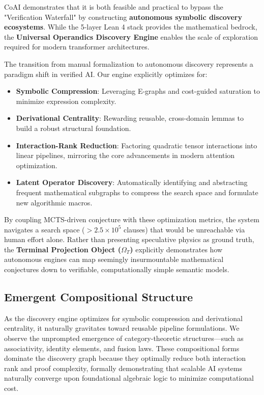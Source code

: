 \documentclass[11pt,a4paper,twocolumn]{article}
\theoremstyle{definition}
\theoremstyle{remark}
\begin{document}
CoAI demonstrates that it is both feasible and practical to bypass the 
"Verification Waterfall" by constructing \textbf{autonomous symbolic 
discovery ecosystems}. While the 5-layer Lean 4 stack provides the 
mathematical bedrock, the \textbf{Universal Operandics Discovery Engine} enables the 
scale of exploration required for modern transformer architectures. 

The transition from manual formalization to autonomous discovery represents 
a paradigm shift in verified AI. Our engine explicitly optimizes for:
\begin{itemize}
    \item \textbf{Symbolic Compression}: Leveraging E-graphs and cost-guided saturation to minimize expression complexity.
    \item \textbf{Derivational Centrality}: Rewarding reusable, cross-domain lemmas to build a robust structural foundation.
    \item \textbf{Interaction-Rank Reduction}: Factoring quadratic tensor interactions into linear pipelines, mirroring the core advancements in modern attention optimization.
    \item \textbf{Latent Operator Discovery}: Automatically identifying and abstracting frequent mathematical subgraphs to compress the search space and formulate new algorithmic macros.
\end{itemize}

By coupling MCTS-driven conjecture with these optimization metrics, the system navigates a search space ($>2.5 \times 10^5$ clauses) that would be unreachable via human effort alone. Rather than presenting speculative physics as ground truth, the \textbf{Terminal Projection Object ($\Omega_T$)} explicitly demonstrates how autonomous engines can map seemingly insurmountable mathematical conjectures down to verifiable, computationally simple semantic models.

\subsection{Emergent Compositional Structure}
As the discovery engine optimizes for symbolic compression and derivational centrality, it naturally gravitates toward reusable pipeline formulations. We observe the unprompted emergence of category-theoretic structures—such as associativity, identity elements, and fusion laws. These compositional forms dominate the discovery graph because they optimally reduce both interaction rank and proof complexity, formally demonstrating that scalable AI systems naturally converge upon foundational algebraic logic to minimize computational cost.
\end{document}
